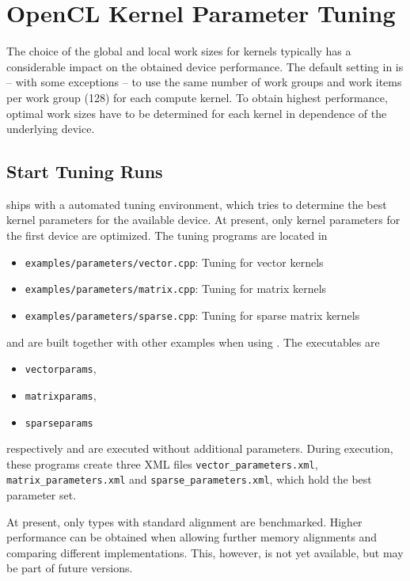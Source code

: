 \chapter{OpenCL Kernel Parameter Tuning} \label{chap:tuning}
The choice of the global and local work sizes for {\OpenCL} kernels typically has a considerable impact on the obtained device performance.
The default setting in {\ViennaCL} is -- with some exceptions -- to use the same number of work groups and work items per work group (128) for each compute kernel.
To obtain highest performance, optimal work sizes have to be determined for each kernel in dependence of the underlying device.

\section{Start Tuning Runs}
{\ViennaCLversion} ships with a automated tuning environment, which tries to determine the best kernel parameters for the available device.
At present, only kernel parameters for the first device are optimized. The tuning programs are located in
\begin{itemize}
 \item \texttt{examples/parameters/vector.cpp}: Tuning for vector kernels
 \item \texttt{examples/parameters/matrix.cpp}: Tuning for matrix kernels
 \item \texttt{examples/parameters/sparse.cpp}: Tuning for sparse matrix kernels
\end{itemize}
and are built together with other examples when using {\CMake}. The executables are
\begin{itemize}
 \item \texttt{vectorparams},
 \item \texttt{matrixparams},
 \item \texttt{sparseparams}
\end{itemize}
respectively and are executed without additional parameters.
During execution, these programs create three XML files \texttt{vector\_parameters.xml}, \texttt{matrix\_parameters.xml} and \texttt{sparse\_parameters.xml}, which hold the best parameter set.

At present, only {\ViennaCL} types with standard alignment are benchmarked. Higher performance can be obtained when allowing further memory alignments and comparing different implementations.
This, however, is not yet available, but may be part of future versions.

